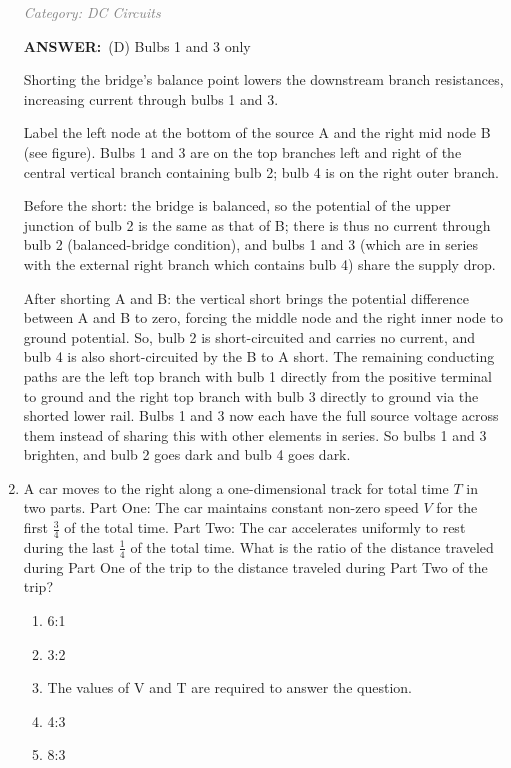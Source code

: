 ﻿\documentclass[12pt, a4paper]{article}
\makeatletter
\newcommand{\finalanswer}[1]{\textbf{ANSWER:}~#1}
\newif\if@categoryprinted
\newcommand{\category}[1]{\if@categoryprinted\relax\else\textit{\textcolor{gray}{Category: #1}}\global\@categoryprintedtrue\fi}
\newcommand{\tags}[1]{}
\makeatother
\begin{document}
\begin{CJK*}{UTF8}{gbsn}
\begin{enumerate}[itemsep=1.0em, topsep=0.6em]
\category{DC Circuits} \tags{}
\begin{answerbox}
\finalanswer{(D) Bulbs 1 and 3 only}
\end{answerbox}
\begin{insightbox}
Shorting the bridge's balance point lowers the downstream branch resistances, increasing current through bulbs 1 and 3.
\end{insightbox}
\begin{solutionbox}

Label the left node at the bottom of the source A and the right mid node B (see figure). Bulbs 1 and 3 are on the top branches left and right of the central vertical branch containing bulb 2; bulb 4 is on the right outer branch.

Before the short: the bridge is balanced, so the potential of the upper junction of bulb 2 is the same as that of B; there is thus no current through bulb 2 (balanced-bridge condition), and bulbs 1 and 3 (which are in series with the external right branch which contains bulb 4) share the supply drop.

After shorting A and B: the vertical short brings the potential difference between A and B to zero, forcing the middle node and the right inner node to ground potential. So, bulb 2 is short-circuited and carries no current, and bulb 4 is also short-circuited by the B to A short. The remaining conducting paths are the left top branch with bulb 1 directly from the positive terminal to ground and the right top branch with bulb 3 directly to ground via the shorted lower rail. Bulbs 1 and 3 now each have the full source voltage across them instead of sharing this with other elements in series. So bulbs 1 and 3 brighten, and bulb 2 goes dark and bulb 4 goes dark.
\end{solutionbox}

\item \label{prob:10}
A car moves to the right along a one-dimensional track for total time $T$ in two parts. Part One: The car maintains constant non-zero speed $V$ for the first $\tfrac{3}{4}$ of the total time. Part Two: The car accelerates uniformly to rest during the last $\tfrac{1}{4}$ of the total time. What is the ratio of the distance traveled during Part One of the trip to the distance traveled during Part Two of the trip?
\begin{enumerate}[label=(\Alph*)]
    \item 6:1
    \item 3:2
    \item The values of V and T are required to answer the question.
    \item 4:3
    \item 8:3
\end{enumerate}


\end{enumerate}
\end{CJK*}
\end{document}
